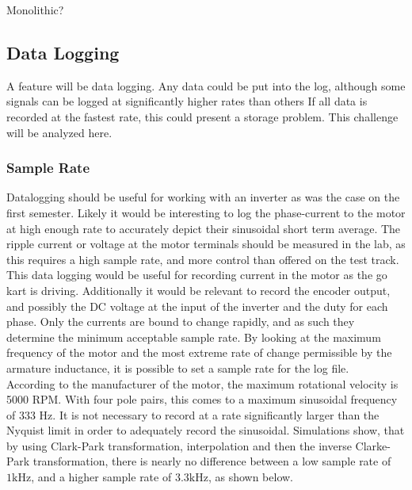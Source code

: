 Monolithic?










\subsection{Data Logging}
A feature will be data logging. 
Any data could be put into the log, although some signals can be logged at significantly higher rates than others
If all data is recorded at the fastest rate, this could present a storage problem.
This challenge will be analyzed here.
\subsubsection{Sample Rate}

Datalogging should be useful for working with an inverter as was the case on the first semester.
Likely it would be interesting to log the phase-current to the motor at high enough rate to accurately depict their sinusoidal short term average.
The ripple current or voltage at the motor terminals should be measured in the lab, as this requires a high sample rate, and more control than offered on the test track.
This data logging would be useful for recording current in the motor as the go kart is driving.
Additionally it would be relevant to record the encoder output, and possibly the DC voltage at the input of the inverter and the duty for each phase.
Only the currents are bound to change rapidly, and as such they determine the minimum acceptable sample rate.
By looking at the maximum frequency of the motor and the most extreme rate of change permissible by the armature inductance, it is possible to set a sample rate for the log file.\\

According to the manufacturer of the motor, the maximum rotational velocity is 5000 RPM.
With four pole pairs, this comes to a maximum sinusoidal frequency of 333 Hz. 
It is not necessary to record at a rate significantly larger than the Nyquist limit in order to adequately record the sinusoidal.
Simulations show, that by using Clark-Park transformation, interpolation and then the inverse Clarke-Park transformation, there is nearly no difference between a low sample rate of $1\si{\kilo\hertz}$, and a higher sample rate of $3.3\si{\kilo\hertz}$, as shown below.

